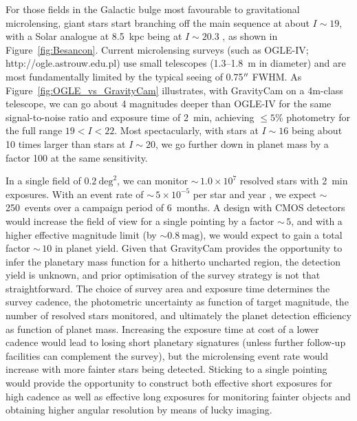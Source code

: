 \documentclass{pasa}%
\newcommand\arcsec{\hbox{$^{\prime\prime}$}}
\begin{document}
For those fields in the Galactic bulge most favourable to gravitational microlensing, giant stars start branching off the main sequence at about $I  \sim 19$, with a Solar analogue at 8.5~kpc being at $I \sim 20.3$ \citep{Robin+2003,Nataf+2013}, as shown in Figure~\ref{fig:Besancon}. Current microlensing surveys (such as OGLE-IV; http://ogle.astrouw.edu.pl) use small telescopes (1.3--1.8~m in diameter) and are most fundamentally limited by the typical seeing of 0.75$\arcsec$ FWHM. As Figure~\ref{fig:OGLE_vs_GravityCam} illustrates, with \mbox{GravityCam} on a 4m-class telescope, we can go about 4 magnitudes deeper than OGLE-IV for the same signal-to-noise ratio and exposure time of 2~min, achieving $\le 5$\% photometry for the full range $19 < I < 22$. Most spectacularly, with stars at $I \sim 16$ being about 10 times larger than stars at $I \sim 20$, we go further down in planet mass by a factor 100 at the same sensitivity.



In a single field of $0.2~\mbox{deg}^2$, we can monitor $\sim\,1.0 \times 10^7$ resolved stars with 2~min exposures. With an event rate of $\sim\,5 \times 10^{-5}$ per star and year \citep{Sumi+2013}, we expect $\sim\,$250~events over a campaign period of 6~months. A design with CMOS detectors would increase the field of view for a single pointing by a factor $\sim\,5$, and with a higher effective magnitude limit (by $\sim 0.8~\mbox{mag}$), 
we would expect to gain a total factor $\sim\,10$ in planet yield.
  Given that \mbox{GravityCam} provides the opportunity to infer the planetary mass function for a hitherto uncharted region, the detection yield is unknown, and prior optimisation of the survey strategy is not that straightforward. The choice of survey area and exposure time determines the survey cadence, the photometric uncertainty as function of target magnitude, the number of resolved stars monitored, and ultimately the planet detection efficiency as function of planet mass. Increasing the exposure time at cost of a lower cadence would lead to losing short planetary signatures (unless further follow-up facilities can complement the survey), but the microlensing event rate would increase with more fainter stars being detected. Sticking to a single pointing would provide the opportunity to construct both effective short exposures for high cadence as well as effective long exposures for monitoring fainter objects and obtaining higher angular resolution by means of lucky imaging.
\end{document}

